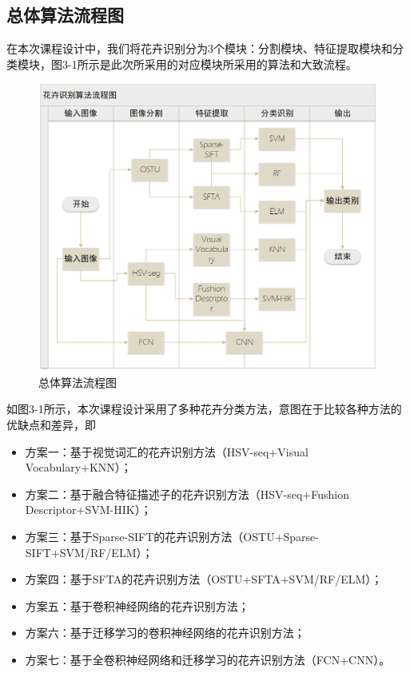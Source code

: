 \documentclass[supercite]{HustGraduPaper}
\begin{document}
\begin{sloppypar}
  \subsection{总体算法流程图}
  在本次课程设计中，我们将花卉识别分为3个模块：分割模块、特征提取模块和分类模块，图3-1所示是此次所采用的对应模块所采用的算法和大致流程。\begin{figure}[H]
    \setlength{\abovecaptionskip}{0.2cm}
    \setlength{\belowcaptionskip}{-0.cm}
      \centering%
      \includegraphics[scale=0.6]{19.jpg}
      \caption{总体算法流程图}
    \end{figure}
  
  如图3-1所示，本次课程设计采用了多种花卉分类方法，意图在于比较各种方法的优缺点和差异，即\begin{itemize}
  \item 方案一：基于视觉词汇的花卉识别方法\cite{1640927}（HSV-seq+Visual Vocabulary+KNN）；
  \item 方案二：基于融合特征描述子的花卉识别方法\cite{8090865}（HSV-seq+Fushion Descriptor+SVM-HIK）；
  \item 方案三：基于Sparse-SIFT的花卉识别方法\cite{6968612}（OSTU+Sparse-SIFT+SVM/RF/ELM）；
  \item 方案四：基于SFTA的花卉识别方法\cite{6968612}（OSTU+SFTA+SVM/RF/ELM）；
  \item 方案五：基于卷积神经网络的花卉识别方法\cite{1640927}；
  \item 方案六：基于迁移学习的卷积神经网络的花卉识别方法\cite{8600536}；
  \item 方案七：基于全卷积神经网络和迁移学习的花卉识别方法\cite{8435127}（FCN+CNN）。
  \end{itemize}


\end{sloppypar}
\end{document}
